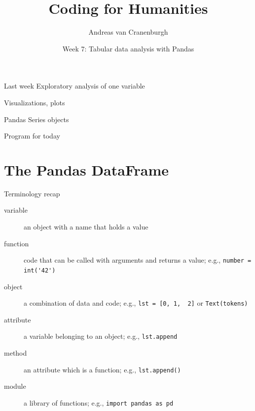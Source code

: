 \documentclass[aspectratio=169,usenames,dvipsnames]{beamer}
\title{Coding for Humanities}
\author{Andreas van Cranenburgh}
\date{Week 7: Tabular data analysis with Pandas}
\begin{document}
\maketitle


\begin{frame}{Last week}
    Exploratory analysis of one variable

    \vspace{1em}
    Visualizations, plots

    \vspace{1em}
    Pandas Series objects
\end{frame}

\begin{frame}{Program for today}
\tableofcontents
\end{frame}



\section{The Pandas DataFrame}
\frame{\tableofcontents[currentsection]}

\begin{frame}[fragile]{Terminology recap}
    \begin{description}
        \item[variable] an object with a name that holds a value
        \item[function] code that can be called with arguments and returns a value;
                e.g., \lstinline|number = int('42')|
        \item[object] a combination of data and code; e.g., \lstinline|lst = [0, 1,  2]|
            or \lstinline|Text(tokens)|
        \item[attribute] a variable belonging to an object; e.g., \lstinline|lst.append|
        \item[method] an attribute which is a function; e.g., \lstinline|lst.append()|
        \item[module] a library of functions; e.g., \lstinline|import pandas as pd|
    \end{description}
\end{frame}
\end{document}
